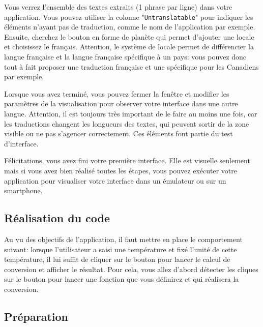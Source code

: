 \documentclass[a4paper,10pt]{article}
\newenvironment{info}%
{\begin{tcolorbox}[breakable,colback=green!5!white,colframe=green!75!black,title=Information]}%
{\end{tcolorbox}}
\begin{document}
Vous verrez l'ensemble des textes extraits (1 phrase par ligne) dans votre application. Vous pouvez utiliser la colonne "\texttt{Untranslatable}" pour indiquer les éléments n'ayant pas de traduction, comme le nom de l'application par exemple. Ensuite, cherchez le bouton en forme de planète qui permet d'ajouter une locale et choisissez le français. Attention, le système de locale permet de différencier la langue française et la langue française spécifique à un pays: vous pouvez donc tout à fait proposer une traduction française et une spécifique pour les Canadiens par exemple. 

Lorsque vous avez terminé, vous pouvez fermer la fenêtre et modifier les paramètres de la visualisation pour observer votre interface dans une autre langue. Attention, il est toujours très important de le faire au moins une fois, car les traductions changent les longueurs des textes, qui peuvent  sortir de la zone visible ou ne pas s'agencer correctement. Ces éléments font partie du test d'interface.



\begin{info}
	Félicitations, vous avez fini votre première interface. Elle est visuelle seulement mais si vous avez bien réalisé toutes les étapes, vous pouvez exécuter votre application pour visualiser votre interface dans un émulateur ou sur un smartphone.
\end{info}


\subsection{Réalisation du code}

Au vu des objectifs de l'application, il faut mettre en place le comportement suivant: lorsque l'utilisateur a saisi une température et fixé l'unité de cette température, il lui suffit de cliquer sur le bouton pour lancer le calcul de conversion et afficher le résultat. Pour cela, vous allez d'abord détecter les cliques sur le bouton pour lancer une fonction que vous définirez et qui réalisera la conversion. 

\subsection{Préparation}
\end{document}
